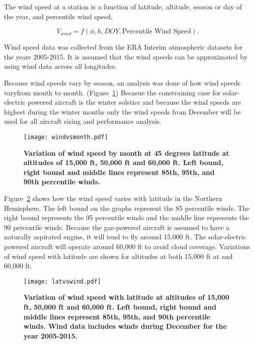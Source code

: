 \documentclass[]{aiaa-tc}%
\begin{document}
The wind speed at a station is a function of latitude, altitude, season or day of the year, and percentile wind speed,

\begin{equation}
    \label{e:windspeed}
    V_{wind} = f(\phi, h, DOY, \text{Percentile Wind Speed}).
    \end{equation}

Wind speed data was collected from the ERA Interim atmospheric datasets for the years 2005-2015.\cite{wind} 
It is assumed that the wind speeds can be approximated by using wind data across all longitudes. 

Because wind speeds vary by season, an analysis was done of how wind speeds varyfrom month to month. (Figure~\ref{f:windvsmonth}) Becasue the constraining case for solar-electric powered aircraft is the winter solstice and because the wind speeds are highest during the winter months only the wind speeds from December will be used for all aircraft sizing and performance analysis. 

\begin{figure}[H]
	\begin{center}
	\texttt{[image: windvsmonth.pdf]}
    \caption{ \textbf{ Variation of wind speed by month at 45 degrees latitude at altitudes of 15,000 ft, 50,000 ft and 60,000 ft.  Left bound, right bound and middle lines represent 85th, 95th, and 90th percentile winds. }}
	\label{f:windvsmonth}
	\end{center}
\end{figure}

Figure~\ref{f:latvswind} shows how the wind speed varies with latitude in the Northern Hemisphere. 
The left bound on the graphs represent the 85 percentile winds.  The right bound represents the 95 percentile winds and the middle line represents the 90 percentile winds. 
Because the gas-powered aircraft is assumed to have a naturally aspirated engine, it will tend to fly around 15,000 ft.  
The solar-electric powered aircraft will operate around 60,000 ft to avoid cloud coverage.  
Variations of wind speed with latitude are shown for altitudes at both 15,000 ft at and 60,000 ft.  \\

\begin{figure}[H]
	\begin{center}
	\texttt{[image: latvswind.pdf]}
    \caption{ \textbf{ Variation of wind speed with latitude at altitudes of 15,000 ft, 50,000 ft and 60,000 ft.  Left bound, right bound and middle lines represent 85th, 95th, and 90th percentile winds. Wind data includes winds during December for the year 2005-2015.}}
	\label{f:latvswind}
	\end{center}
\end{figure}
\end{document}
